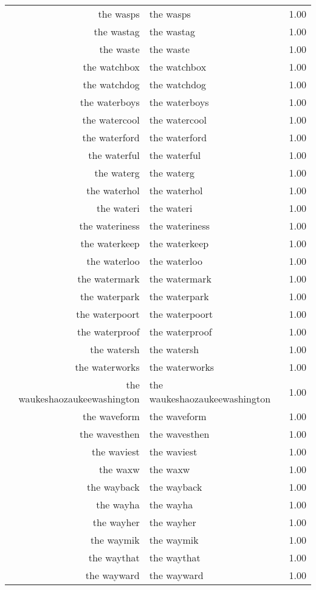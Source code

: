 \begin{table}[ht]
\begin{tabular}{rlr}
  the wasps & the wasps & 1.00 \\ 
  the wastag & the wastag & 1.00 \\ 
  the waste & the waste & 1.00 \\ 
  the watchbox & the watchbox & 1.00 \\ 
  the watchdog & the watchdog & 1.00 \\ 
  the waterboys & the waterboys & 1.00 \\ 
  the watercool & the watercool & 1.00 \\ 
  the waterford & the waterford & 1.00 \\ 
  the waterful & the waterful & 1.00 \\ 
  the waterg & the waterg & 1.00 \\ 
  the waterhol & the waterhol & 1.00 \\ 
  the wateri & the wateri & 1.00 \\ 
  the wateriness & the wateriness & 1.00 \\ 
  the waterkeep & the waterkeep & 1.00 \\ 
  the waterloo & the waterloo & 1.00 \\ 
  the watermark & the watermark & 1.00 \\ 
  the waterpark & the waterpark & 1.00 \\ 
  the waterpoort & the waterpoort & 1.00 \\ 
  the waterproof & the waterproof & 1.00 \\ 
  the watersh & the watersh & 1.00 \\ 
  the waterworks & the waterworks & 1.00 \\ 
  the waukeshaozaukeewashington & the waukeshaozaukeewashington & 1.00 \\ 
  the waveform & the waveform & 1.00 \\ 
  the wavesthen & the wavesthen & 1.00 \\ 
  the waviest & the waviest & 1.00 \\ 
  the waxw & the waxw & 1.00 \\ 
  the wayback & the wayback & 1.00 \\ 
  the wayha & the wayha & 1.00 \\ 
  the wayher & the wayher & 1.00 \\ 
  the waymik & the waymik & 1.00 \\ 
  the waythat & the waythat & 1.00 \\ 
  the wayward & the wayward & 1.00 \\ 

\end{tabular}
\end{table}
